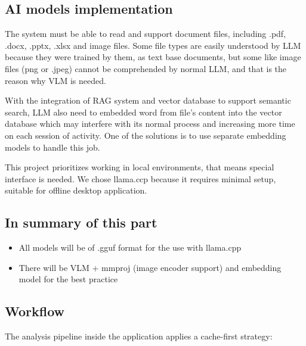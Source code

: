\documentclass[12pt,oneside,openright,a4paper]{cpe-english-project}
\begin{document}
\subsection*{AI models implementation}
The system must be able to read and support document files, including .pdf, .docx, .pptx, .xlsx and image files. Some file types are easily understood by LLM because they were trained by them, as text base documents, but some like image files (png or .jpeg) cannot be comprehended by normal LLM, and that is the reason why VLM is needed.

With the integration of RAG system and vector database to support semantic search, LLM also need to embedded word from file's content into the vector database which may interfere with its normal process and increasing more time on each session of activity. One of the solutions is to use separate embedding models to handle this job.

This project prioritizes working in local environments, that means special interface is needed. We chose llama.ccp because it requires minimal setup, suitable for offline desktop application.

\subsection*{In summary of this part}
\begin{itemize}
\item All models will be of .gguf format for the use with llama.cpp
\item There will be VLM + mmproj (image encoder support) and embedding model for the best practice
\end{itemize}
\subsection*{Workflow}
The analysis pipeline inside the application applies a cache-first strategy:
\end{document}
